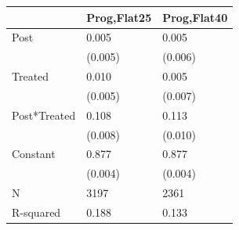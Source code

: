 \begin{tabular}{lll}
\toprule
 & Prog,Flat25 & Prog,Flat40 \\
\midrule
Post & 0.005 & 0.005 \\
 & (0.005) & (0.006) \\
Treated & 0.010 & 0.005 \\
 & (0.005) & (0.007) \\
Post*Treated & 0.108 & 0.113 \\
 & (0.008) & (0.010) \\
Constant & 0.877 & 0.877 \\
 & (0.004) & (0.004) \\
N & 3197 & 2361 \\
R-squared & 0.188 & 0.133 \\
\bottomrule
\end{tabular}
